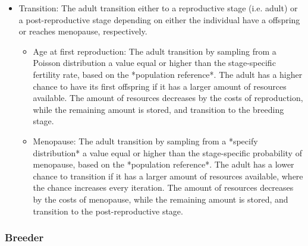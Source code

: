 \documentclass{article}
\begin{document}
\begin{itemize}
    \item Transition: The adult transition either to a reproductive stage (i.e. adult) or a post-reproductive stage depending on either the individual have a offspring or reaches menopause, respectively.
    \begin{itemize}
        \item Age at first reproduction: The adult transition by sampling from a Poisson distribution a value equal or higher than the stage-specific fertility rate, based on the *population reference*. The adult has a higher chance to have its first offspring if it has a larger amount of resources available. The amount of resources decreases by the costs of reproduction, while the remaining amount is stored, and transition to the breeding stage.
        \item Menopause: The adult transition by sampling from a *specify distribution* a value equal or higher than the stage-specific probability of menopause, based on the *population reference*. The adult has a lower chance to transition if it has a larger amount of resources available, where the chance increases every iteration. The amount of resources decreases by the costs of menopause, while the remaining amount is stored, and transition to the post-reproductive stage.
    \end{itemize}
\end{itemize}

\subsubsection{Breeder}
\end{document}
